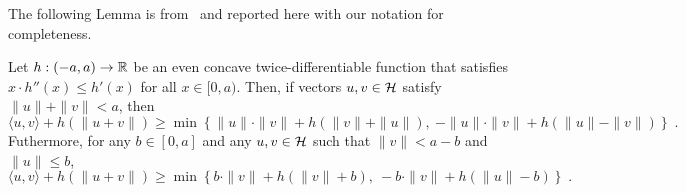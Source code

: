 The following Lemma is from~\cite{McMahanO14} and reported here with our notation for completeness.
\begin{lemma}[Extremes]
\label{lemma:extremes}
Let $h:(-a,a) \to \mathbb{R}$ be an even concave twice-differentiable function that
satisfies $x \cdot h''(x) \le h'(x)$ for all $x \in [0,a)$. Then, if vectors
$u,v \in \mathcal{H}$ satisfy $\|u\| + \|v\| < a$, then
\begin{equation}
\label{equation:lemma-extremes-1}
\langle u, v \rangle + h(\|u + v\|) \ge \min \left\{ \|u\| \cdot \|v\| + h(\|v\| + \|u\|), \ - \|u\| \cdot \|v\| + h(\|u\| - \|v\|) \right\} \; .
\end{equation}
Futhermore, for any $b \in [0,a]$ and any $u, v \in \mathcal{H}$ such that $\|v\| < a - b$ and $\|u\| \le b$,
\begin{equation}
\label{equation:lemma-extremes-2}
\langle u, v \rangle + h(\|u + v\|) \ge \min \left\{ b \cdot \|v\| + h(\|v\| + b), \ - b \cdot \|v\| + h(\|u\| - b) \right\} \; .
\end{equation}
\end{lemma}
